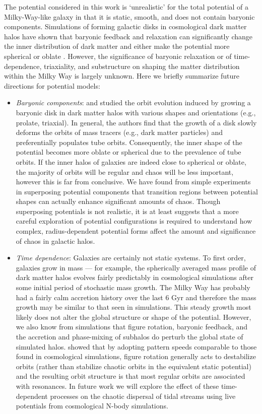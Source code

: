 \documentclass[letterpaper,12pt,preprint]{aastex}
\begin{document}
The potential considered in this work is `unrealistic' for the total potential of a Milky-Way-like galaxy in that it is static, smooth, and does not contain baryonic components. Simulations of forming galactic disks in cosmological dark matter halos have shown that baryonic feedback and relaxation can significantly change the inner distribution of dark matter and either make the potential more spherical or oblate \citep{dubinski94,kazantzidis04, bryan13, butsky15}. However, the significance of baryonic relaxation or of time-dependence, triaxiality, and substructure on shaping the matter distribution within the Milky Way is largely unknown. Here we briefly summarize future directions for potential models:
\begin{itemize}
	\item \emph{Baryonic components}: \cite[][D08]{debattista08} and \cite[][V10]{valluri10} studied the orbit evolution induced by growing a baryonic disk in dark matter halos with various shapes and orientations (e.g., prolate, triaxial). In general, the authors find that the growth of a disk slowly deforms the orbits of mass tracers (e.g., dark matter particles) and preferentially populates tube orbits. Consequently, the inner shape of the potential becomes more oblate or spherical due to the prevalence of tube orbits. If the inner halos of galaxies are indeed close to spherical or oblate, the majority of orbits will be regular and chaos will be less important, however this is far from conclusive. We have found from simple experiments in superposing potential components that transition regions between potential shapes can actually enhance significant amounts of chaos. Though superposing potentials is not realistic, it is at least suggests that a more careful exploration of potential configurations is required to understand how complex, radius-dependent potential forms affect the amount and significance of chaos in galactic halos.

\item \emph{Time dependence}: Galaxies are certainly not static systems. To first order, galaxies grow in mass --- for example, the spherically averaged mass profile of dark matter halos evolves fairly predictably in cosmological simulations \citep{wechsler02, buist14} after some initial period of stochastic mass growth. The Milky Way has probably had a fairly calm accretion history over the last 6 Gyr and therefore the mass growth may be similar to that seen in simulations. This steady growth most likely does not alter the global structure or shape of the potential. However, we also know from simulations that figure rotation, baryonic feedback, and the accretion and phase-mixing of subhalos do perturb the global state of simulated halos. \cite{deibel11} showed that by adopting pattern speeds comparable to those found in cosmological simulations, figure rotation generally acts to destabilize orbits (rather than stabilize chaotic orbits in the equivalent static potential) and the resulting orbit structure is that most regular orbits are associated with resonances. In future work we will explore the effect of these time-dependent processes on the chaotic dispersal of tidal streams using live potentials from cosmological N-body simulations.


\end{itemize}
\end{document}
